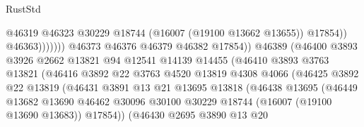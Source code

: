 \begin{lexlean}{RustStd}
\begin{coremodule}
                                                @46319
                                                @46323
                                                @30229
                                                @18744
                                                (@16007 (@19100 @13662 @13655))
                                                @17854))
                                            @46363)))))))
                              @46373
                              @46376
                              @46379
                              @46382
                              @17854))
                          @46389
                          (@46400
                            @3893
                            @3926
                            @2662
                            @13821
                            @94
                            @12541
                            @14139
                            @14455
                            (@46410
                              @3893
                              @3763
                              @13821
                              (@46416
                                @3892
                                @22
                                @3763
                                @4520
                                @13819
                                @4308
                                @4066
                                (@46425
                                  @3892
                                  @22
                                  @13819
                                  (@46431
                                    @3891
                                    @13
                                    @21
                                    @13695
                                    @13818
                                    (@46438
                                      @13695
                                      (@46449
                                        @13682
                                        @13690
                                        @46462
                                        @30096
                                        @30100
                                        @30229
                                        @18744
                                        (@16007 (@19100 @13690 @13683))
                                        @17854))
                                    (@46430
                                      @2695
                                      @3890
                                      @13
                                      @20

\end{coremodule}
\end{lexlean}
